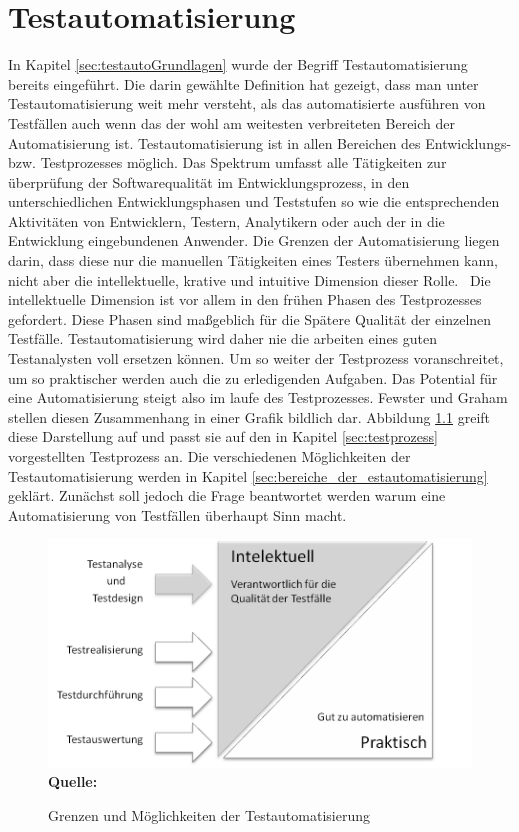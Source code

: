 \chapter{Testautomatisierung}
\label{sec:testautomatisierung}
In Kapitel \ref{sec:testautoGrundlagen} wurde der Begriff Testautomatisierung bereits eingeführt. Die darin gewählte Definition hat gezeigt, dass man unter Testautomatisierung weit mehr versteht, als das automatisierte ausführen von Testfällen auch wenn das der wohl am weitesten verbreiteten Bereich der Automatisierung ist.
Testautomatisierung ist in allen Bereichen des Entwicklungs- bzw. Testprozesses möglich.
\glqq Das Spektrum umfasst alle Tätigkeiten zur überprüfung der Softwarequalität im Entwicklungsprozess, in den unterschiedlichen Entwicklungsphasen und Teststufen so wie die entsprechenden Aktivitäten von Entwicklern, Testern, Analytikern oder auch der in die Entwicklung eingebundenen Anwender. Die Grenzen der Automatisierung liegen darin, dass diese nur die manuellen Tätigkeiten eines Testers übernehmen kann, nicht aber die intellektuelle, krative und intuitive Dimension dieser Rolle.\grqq\ \cite[S.7]{seidl_basiswissen_2012}
Die intellektuelle Dimension ist vor allem in den frühen Phasen des Testprozesses gefordert. Diese Phasen sind maßgeblich für die Spätere Qualität der einzelnen Testfälle. Testautomatisierung wird daher nie die arbeiten eines guten Testanalysten voll ersetzen können. Um so weiter der Testprozess voranschreitet, um so praktischer werden auch die zu erledigenden Aufgaben. Das Potential für eine Automatisierung steigt also im laufe des Testprozesses.
Fewster und Graham stellen diesen Zusammenhang in einer Grafik bildlich dar. \cite[vgl. S.18]{fewster_software_1999} Abbildung \ref{fig:intellektuellVsPraktisch} greift diese Darstellung auf und passt sie auf den in Kapitel \ref{sec:testprozess} vorgestellten Testprozess an. Die verschiedenen Möglichkeiten der Testautomatisierung werden in Kapitel \ref{sec:bereiche_der_estautomatisierung} geklärt. Zunächst soll jedoch die Frage beantwortet werden warum eine Automatisierung von Testfällen überhaupt Sinn macht.

\begin{figure}[htb]
  \centering  
  \includegraphics[scale=1]{img/intelektuellVsPraktisch.png}\\
  \footnotesize\sffamily\textbf{Quelle:} \cite[vgl. S.18]{fewster_software_1999}
  \caption{Grenzen und Möglichkeiten der Testautomatisierung}
  \label{fig:intellektuellVsPraktisch}
\end{figure}


